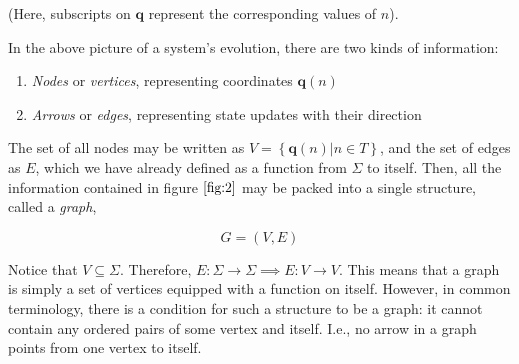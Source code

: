 \documentclass[12 pt]{article}
\begin{document}
(Here, subscripts on $\pmb{q}$ represent the corresponding values of $n$).

In the above picture of a system's evolution, there are two kinds of information:

\begin{enumerate}
  \item \emph{Nodes} or \emph{vertices}, representing coordinates $\pmb{q} \left( n \right)$

  \item \emph{Arrows} or \emph{edges}, representing state updates with their direction
\end{enumerate}

The set of all nodes may be written as $V = \left\{ \pmb{q} \left( n \right) \vert n \in T \right\}$, and the set of edges as $E$, which we have already defined as a function from $\Sigma$ to itself. Then, all the information contained in figure $\ref{fig:2}$ may be packed into a single structure, called a \emph{graph},

$$G = \left( V, E \right)$$

Notice that $V \subseteq \Sigma$. Therefore, $E : \Sigma \rightarrow \Sigma \implies E : V \rightarrow V$. This means that a graph is simply a set of vertices equipped with a function on itself. However, in common terminology, there is a condition for such a structure to be a graph: it cannot contain any ordered pairs of some vertex and itself. I.e., no arrow in a graph points from one vertex to itself.
\end{document}
